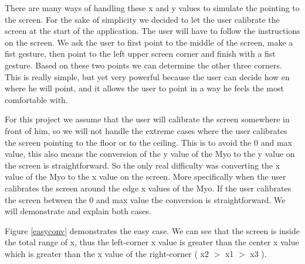 \documentclass{article}
\begin{document}
There are many ways of handling these x and y values to simulate the pointing to the screen. For the sake of simplicity we decided to let the user calibrate the screen at the start of the application. The user will have to follow the instructions on the screen. We ask the user to first point to the middle of the screen, make a fist gesture, then point to the left upper screen corner and finish with a fist gesture. Based on these two points we can determine the other three corners.  This is really simple, but yet very powerful because the user can decide how en where he will point, and it allows the user to point in a way he feels the most comfortable with.

For this project we assume that the user will calibrate the screen somewhere in front of him, so we will not handle the extreme cases where the user calibrates the screen pointing to the floor or to the ceiling. This is to avoid the 0 and max value, this also means the conversion of the y value of the Myo to the y value on the screen is straightforward. So the only real difficulty was converting the x value of the Myo to the x value on the screen. More specifically when the user calibrates the screen around the edge x values of the Myo. If the user calibrates the screen between the 0 and max value the conversion is straightforward. We will demonstrate and explain both cases.

Figure \ref{easyconv} demonstrates the easy case. We can see that the screen is inside the total range of x, thus the left-corner x value is greater than the center x value which is greater than the x value of the right-corner ( x2 $>$ x1 $>$ x3 ).
\end{document}
